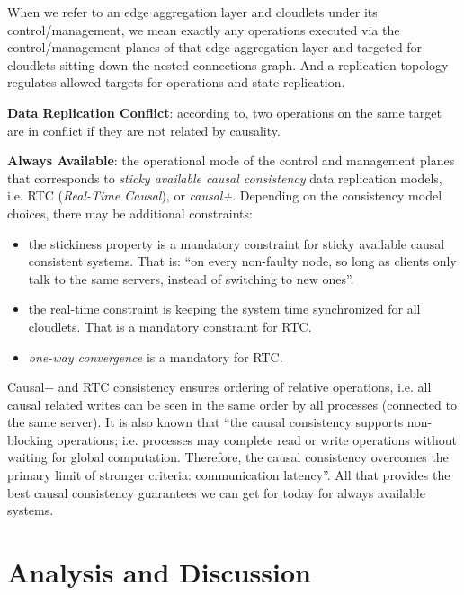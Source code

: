 \documentclass[conference]{IEEEtran}
\begin{document}
When we refer to an edge aggregation layer and cloudlets under its
control/management, we mean exactly any operations executed via the
control/management planes of that edge aggregation layer and targeted for
cloudlets sitting down the nested connections graph. And a replication topology
regulates allowed targets for operations and state replication.

\textbf{Data Replication Conflict}: according to\cite{b1}, two operations on
the same target are in conflict if they are not related by causality.

\textbf{Always Available}: the operational mode of the control and management
planes that corresponds to \textit{sticky available causal
consistency}\cite{b4} data replication models, i.e. RTC (\textit{Real-Time
Causal}\cite{b2}), or \textit{causal+}\cite{b1}. Depending on the consistency
model choices, there may be additional constraints:

\begin{itemize}
  \item the stickiness property is a mandatory constraint for sticky available
    causal consistent systems. That is: ``on every non-faulty node, so long
    as clients only talk to the same servers, instead of switching to new
    ones''\cite{b4}.

  \item the real-time constraint is keeping the system time synchronized for
    all cloudlets. That is a mandatory constraint for RTC.

  \item \textit{one-way convergence}\cite{b2} is a mandatory for RTC.
\end{itemize}

Causal+ and RTC consistency ensures ordering of relative operations, i.e. all
causal related writes can be seen in the same order by all processes (connected
to the same server). It is also known that ``the causal consistency supports
non-blocking operations; i.e. processes may complete read or write operations
without waiting for global computation. Therefore, the causal consistency
overcomes the primary limit of stronger criteria: communication
latency''\cite{b6}. All that provides the best causal consistency guarantees we
can get for today for always available systems.

\section{Analysis and Discussion}
\end{document}
